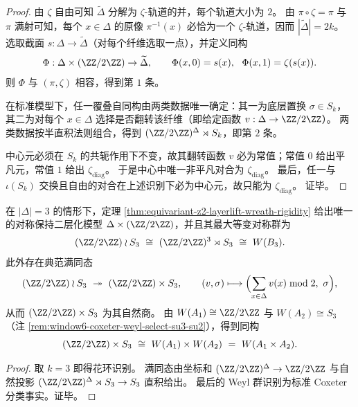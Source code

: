 \begin{proof}
由 \(\zeta\) 自由可知 \(\widetilde\Delta\) 分解为 \(\zeta\)-轨道的并，每个轨道大小为 \(2\)。
由 \(\pi\circ\zeta=\pi\) 与 \(\pi\) 满射可知，每个 \(x\in\Delta\) 的原像 \(\pi^{-1}(x)\) 必恰为一个 \(\zeta\)-轨道，因而 \(|\widetilde\Delta|=2k\)。
选取截面 \(s:\Delta\to\widetilde\Delta\)（对每个纤维选取一点），并定义同构
\[
\Phi:\Delta\times(\ZZ/2\ZZ)\to\widetilde\Delta,\qquad
\Phi(x,0)=s(x),\ \ \Phi(x,1)=\zeta(s(x)).
\]
则 \(\Phi\) 与 \((\pi,\zeta)\) 相容，得到第 \(1\) 条。
\par
在标准模型下，任一覆叠自同构由两类数据唯一确定：其一为底层置换 \(\sigma\in S_k\)，其二为对每个 \(x\in\Delta\) 选择是否翻转该纤维（即给定函数 \(v:\Delta\to\ZZ/2\ZZ\)）。
两类数据按半直积法则组合，得到 \((\ZZ/2\ZZ)^{\Delta}\rtimes S_k\)，即第 \(2\) 条。
\par
中心元必须在 \(S_k\) 的共轭作用下不变，故其翻转函数 \(v\) 必为常值；常值 \(0\) 给出平凡元，常值 \(1\) 给出 \(\zeta_{\mathrm{diag}}\)。
于是中心中唯一非平凡对合为 \(\zeta_{\mathrm{diag}}\)。
最后，任一与 \(\iota(S_k)\) 交换且自由的对合在上述识别下必为中心元，故只能为 \(\zeta_{\mathrm{diag}}\)。
证毕。
\end{proof}

\begin{corollary}\label{cor:bdry-three-layer-symmetric-binary-lift-wreath-quotient}
在 \(|\Delta|=3\) 的情形下，定理 \ref{thm:equivariant-z2-layerlift-wreath-rigidity} 给出唯一的对称保持二层化模型 \(\Delta\times(\ZZ/2\ZZ)\)，并且其最大等变对称群为
\[
(\ZZ/2\ZZ)\wr S_3\ \cong\ (\ZZ/2\ZZ)^3\rtimes S_3\ \cong\ W(B_3).
\]
此外存在典范满同态
\[
(\ZZ/2\ZZ)\wr S_3\ \twoheadrightarrow\ (\ZZ/2\ZZ)\times S_3,
\qquad
(v,\sigma)\longmapsto\Bigl(\sum_{x\in\Delta} v(x)\bmod 2,\ \sigma\Bigr),
\]
从而 \((\ZZ/2\ZZ)\times S_3\) 为其自然商。
由 \(W(A_1)\cong\ZZ/2\ZZ\) 与 \(W(A_2)\cong S_3\)（注 \ref{rem:window6-coxeter-weyl-select-su3-su2}），得到同构
\[
(\ZZ/2\ZZ)\times S_3\ \cong\ W(A_1)\times W(A_2)\ =\ W(A_1\times A_2).
\]
\end{corollary}
\begin{proof}
取 \(k=3\) 即得花环识别。
满同态由坐标和 \((\ZZ/2\ZZ)^{\Delta}\to\ZZ/2\ZZ\) 与自然投影 \((\ZZ/2\ZZ)^{\Delta}\rtimes S_3\to S_3\) 直积给出。
最后的 Weyl 群识别为标准 Coxeter 分类事实。证毕。
\end{proof}

